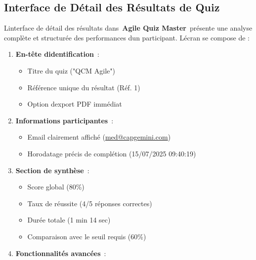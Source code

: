 \documentclass[12pt,a4paper,twoside]{report}
\begin{document}
\hypertarget{interface-de-duxe9tail-des-ruxe9sultats-de-quiz}{%
\subsection{Interface de Détail des Résultats de
Quiz}\label{interface-de-duxe9tail-des-ruxe9sultats-de-quiz}}

L\textquotesingle interface de détail des résultats dans~\textbf{Agile
Quiz Master}~présente une analyse complète et structurée des
performances d\textquotesingle un participant. L\textquotesingle écran
se compose de :

\begin{enumerate}
\def\labelenumi{\arabic{enumi}.}
\item
  \textbf{En-tête d\textquotesingle identification}~:

  \begin{itemize}
  \item
    Titre du quiz ("QCM Agile")
  \item
    Référence unique du résultat (Réf. 1)
  \item
    Option d\textquotesingle export PDF immédiat
  \end{itemize}
\item
  \textbf{Informations participantes}~:

  \begin{itemize}
  \item
    Email clairement affiché
    (\href{https://mailto:med@copgermini.com/}{med@capgemini.com})
  \item
    Horodatage précis de complétion (15/07/2025 09:40:19)
  \end{itemize}
\item
  \textbf{Section de synthèse}~:

  \begin{itemize}
  \item
    Score global (80\%)
  \item
    Taux de réussite (4/5 réponses correctes)
  \item
    Durée totale (1 min 14 sec)
  \item
    Comparaison avec le seuil requis (60\%)
  \end{itemize}
\item
  \textbf{Fonctionnalités avancées}~:


\end{enumerate}
\end{document}
